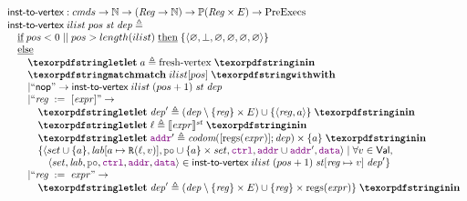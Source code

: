 {\small
\[
\inarr{
  \instToVrtx : \Carm \rightarrow \mathbb{N} \rightarrow (\Reg \rightarrow \mathbb{N}) \rightarrow \Pset(\Reg \times E)
    \rightarrow \PreExecutions \\
  \instToVrtx \; ilist \; pos \; \PromState \; \dep \defeq \\
  \quad \textIf   pos < 0 \; || \; pos > length(ilist) \; \textThen
    \{\tup{\emptyset, \bot, \emptyset, \emptyset, \emptyset, \emptyset}\} \\
  \quad \textElse \\
  \qquad
    \letdef{a}{{\rm fresh\text{-}vertex} } \\
  \qquad \kw{match} \; ilist[pos] \; \kw{with} \\
  \qquad
    \begin{array}{@{}l}
    | ``\nop" \rightarrow \instToVrtx \; ilist \; (pos + 1) \; \PromState \; \dep \\
    | ``\readInst{\reg}{\expr}" \rightarrow \\
      \quad \inarr{
        \letdef{\dep'}{(\dep \setminus \{\reg\} \times E) \cup \{\tup{\reg, a}\}} \\
        \letdef{\loc}{\semState{\expr}{\PromState}} \\
        \letdef{\lADDR'}{ \codom{[\regs(\expr)]; \dep} \times \{a\} } \\
        \{\tup{set \cup\{a\}, \lab[a \mapsto \rlab{}{\loc}{\val}], \lPO \cup \{a\} \times set, \lCTRL, \lADDR \cup \lADDR', \lDATA}
        \mid \forall \val \in \Val, \\
        \quad \tup{set, \lab, \lPO, \lCTRL, \lADDR, \lDATA} \in
          \instToVrtx \; ilist \; (pos + 1) \; \PromState[\reg \mapsto \val] \; \dep'\} \\
      } \\
    | ``\assignInst{\reg}{\expr}" \rightarrow \\
      \quad \inarr{
        \letdef{\dep'}{(\dep \setminus \{\reg\} \times E) \cup \{\reg\} \times \regs(\expr) \}} \\
}
\end{array}}\]}

